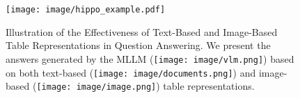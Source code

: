 \begin{figure}[t]
    \centering
    \texttt{[image: image/hippo\_example.pdf]}
    \caption{Illustration of the Effectiveness of Text-Based and Image-Based Table Representations in Question Answering. We present the answers generated by the MLLM (\texttt{[image: image/vlm.png]}) based on both text-based (\texttt{[image: image/documents.png]}) and image-based (\texttt{[image: image/image.png]}) table representations.}
    \label{fig:example}
\end{figure}